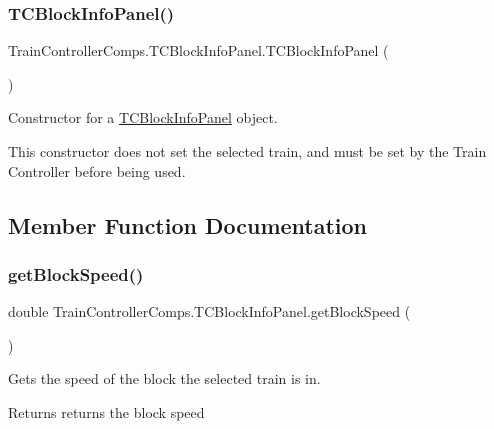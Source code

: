 \subsubsection{\texorpdfstring{T\+C\+Block\+Info\+Panel()}{TCBlockInfoPanel()}}
{\footnotesize\ttfamily Train\+Controller\+Comps.\+T\+C\+Block\+Info\+Panel.\+T\+C\+Block\+Info\+Panel (\begin{DoxyParamCaption}{ }\end{DoxyParamCaption})}



Constructor for a \hyperlink{classTrainControllerComps_1_1TCBlockInfoPanel}{T\+C\+Block\+Info\+Panel} object. 

This constructor does not set the selected train, and must be set by the Train Controller before being used. 

\subsection{Member Function Documentation}
\mbox{\label{classTrainControllerComps_1_1TCBlockInfoPanel_af6abb156c9e61d36d7fd3d8cb8c899f6}} 
\subsubsection{\texorpdfstring{get\+Block\+Speed()}{getBlockSpeed()}}
{\footnotesize\ttfamily double Train\+Controller\+Comps.\+T\+C\+Block\+Info\+Panel.\+get\+Block\+Speed (\begin{DoxyParamCaption}{ }\end{DoxyParamCaption})}



Gets the speed of the block the selected train is in. 

\begin{DoxyReturn}{Returns}
returns the block speed 
\end{DoxyReturn}
\mbox{\label{classTrainControllerComps_1_1TCBlockInfoPanel_a0bbafa154ac2cdc3b83140374e85ed25}} 

